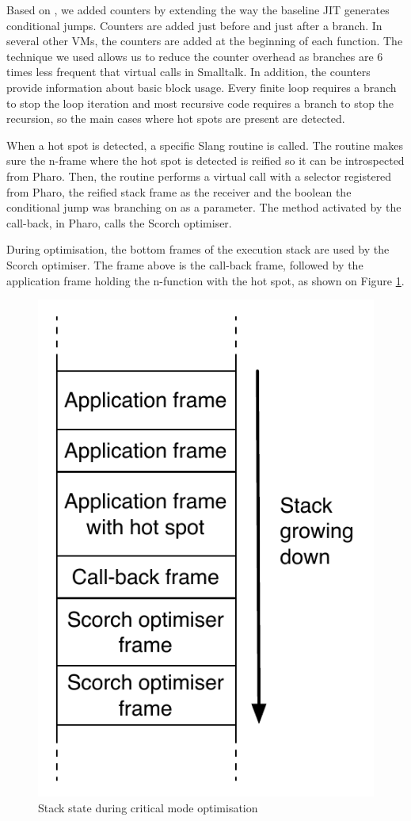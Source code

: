 \documentclass[a4paper,12pt,twoside]{../includes/ThesisStyle}
\begin{document}

Based on \cite{Arn02}, we added counters by extending the way the baseline JIT generates conditional jumps. Counters are added just before and just after a branch. In several other VMs, the counters are added at the beginning of each function. The technique we used allows us to reduce the counter overhead as branches are 6 times less frequent that virtual calls in Smalltalk. In addition, the counters provide information about basic block usage. Every finite loop requires a branch to stop the loop iteration and most recursive code requires a branch to stop the recursion, so the main cases where hot spots are present are detected.

When a hot spot is detected, a specific Slang routine is called. The routine makes sure the n-frame where the hot spot is detected is reified so it can be introspected from Pharo. Then, the routine performs a virtual call with a selector registered from Pharo, the reified stack frame as the receiver and the boolean the conditional jump was branching on as a parameter. The method activated by the call-back, in Pharo, calls the Scorch optimiser.

During optimisation, the bottom frames of the execution stack are used by the Scorch optimiser. The frame above is the call-back frame, followed by the application frame holding the n-function with the hot spot, as shown on Figure \ref{fig:HotSpotCallBackStack}.

\begin{figure}[h!]
    \begin{center}
        \includegraphics[width=0.35\linewidth]{HotSpotCallBackStack}
        \caption{Stack state during critical mode optimisation}
        \label{fig:HotSpotCallBackStack}
    \end{center}
\end{figure}
\end{document}

